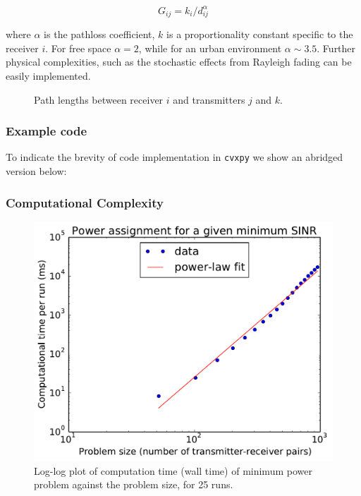 \documentclass[twocolumn,secnumarabic,amssymb, nobibnotes, aps, prl,superscriptaddress]{revtex4-1}
\begin{document}
\begin{equation}
G_{ij} = k_i/d_{ij}^\alpha
\end{equation}

where $\alpha$ is the pathloss coefficient, $k$ is a proportionality constant specific to the receiver $i$.  For free space $\alpha = 2$, while for an urban environment $\alpha \sim 3.5$.  Further physical complexities, such as the stochastic effects from Rayleigh fading can be easily implemented.

\begin{figure}[H]
\centering
{}
\caption{Path lengths between receiver $i$ and transmitters $j$ and $k$.}\label{fig:spatial_diagram}
\end{figure}

\subsubsection{Example code}
To indicate the brevity of code implementation in \texttt{cvxpy} we show an abridged version below: 

\subsubsection{Computational Complexity}

\begin{figure}[H]
\includegraphics[width=0.9\linewidth]{magazineMinSINR.pdf}
\caption{\label{fig:MinSINR}Log-log plot of computation time (wall time) of minimum power problem against the problem size, for 25 runs.}
\end{figure}
\end{document}
